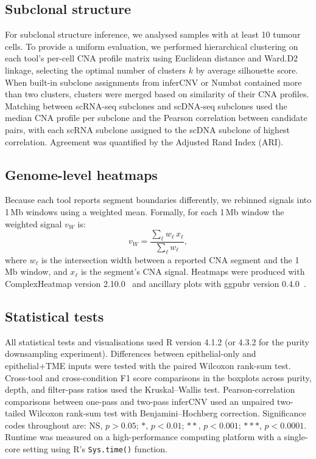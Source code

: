 \documentclass[11pt]{article}
\begin{document}
\subsection{Subclonal structure}

For subclonal structure inference, we analysed samples with at least 10
tumour cells. To provide a uniform evaluation, we performed hierarchical
clustering on each tool's per-cell CNA profile matrix using Euclidean
distance and Ward.D2 linkage, selecting the optimal number of clusters $k$
by average silhouette score. When built-in subclone assignments from inferCNV
or Numbat contained more than two clusters, clusters were merged based on
similarity of their CNA profiles. Matching between scRNA-seq subclones and
scDNA-seq subclones used the median CNA profile per subclone and the
Pearson correlation between candidate pairs, with each scRNA subclone
assigned to the scDNA subclone of highest correlation. Agreement was
quantified by the Adjusted Rand Index (ARI).

\subsection{Genome-level heatmaps}

Because each tool reports segment boundaries differently, we rebinned
signals into 1\,Mb windows using a weighted mean. Formally, for each 1\,Mb
window the weighted signal $v_W$ is:
\begin{equation}
v_W = \frac{\sum_{\ell} w_{\ell} \, x_{\ell}}{\sum_{\ell} w_{\ell}},
\end{equation}
where $w_{\ell}$ is the intersection width between a reported CNA segment
and the 1\,Mb window, and $x_{\ell}$ is the segment's CNA signal. Heatmaps
were produced with ComplexHeatmap version
2.10.0~\cite{gu2016complexheatmap} and ancillary plots with ggpubr version
0.4.0~\cite{kassambara2020ggpubr}.

\subsection{Statistical tests}

All statistical tests and visualisations used R version 4.1.2 (or 4.3.2 for
the purity downsampling experiment). Differences between epithelial-only and
epithelial+TME inputs were tested with the paired Wilcoxon rank-sum test.
Cross-tool and cross-condition F1 score comparisons in the boxplots across
purity, depth, and filter-pass ratios used the Kruskal--Wallis test.
Pearson-correlation comparisons between one-pass and two-pass inferCNV used
an unpaired two-tailed Wilcoxon rank-sum test with Benjamini--Hochberg
correction. Significance codes throughout are: NS, $p > 0.05$; $*$, $p <
0.01$; $**$, $p < 0.001$; $***$, $p < 0.0001$. Runtime was measured on a
high-performance computing platform with a single-core setting using R's
\texttt{Sys.time()} function.
\end{document}
